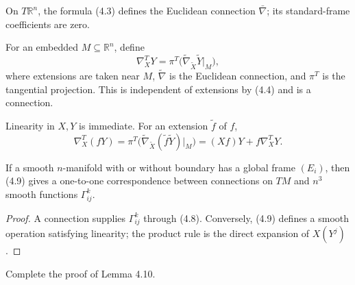 \begin{example}
\label{ex:euclidean-connection}
On $T\mathbb R^n$, the formula (4.3) defines the Euclidean connection $\bar\nabla$; its standard-frame coefficients are zero.
\end{example}

\begin{example}
\label{ex:tangential-connection-submanifold}
For an embedded $M\subseteq\mathbb R^n$, define
\[
\nabla_X^TY=\pi^T\bigl(\widetilde\nabla_{\widetilde X}\widetilde Y|_M\bigr),
\]
where extensions are taken near $M$, $\widetilde\nabla$ is the Euclidean connection, and $\pi^T$ is the tangential projection. This is independent of extensions by (4.4) and is a connection.

\sketch Linearity in $X,Y$ is immediate. For an extension $\widetilde f$ of $f$,
\[
\nabla_X^T(fY)=\pi^T\bigl(\widetilde\nabla_{\widetilde X}(\widetilde f\widetilde Y)|_M\bigr)=(Xf)Y+f\nabla_X^TY.
\]
\end{example}

\begin{lemma}
\label{lem:connections-from-connection-coefficients}
If a smooth $n$-manifold with or without boundary has a global frame $(E_i)$, then (4.9) gives a one-to-one correspondence between connections on $TM$ and $n^3$ smooth functions $\Gamma^k_{ij}$.
\end{lemma}
\begin{proof}
\sketch A connection supplies $\Gamma^k_{ij}$ through (4.8). Conversely, (4.9) defines a smooth operation satisfying linearity; the product rule is the direct expansion of $X(Y^j)$.
\end{proof}

\begin{exercise}
\label{exer:complete-proof-lemma-4.10}
\leanok
Complete the proof of Lemma 4.10.
\end{exercise}

